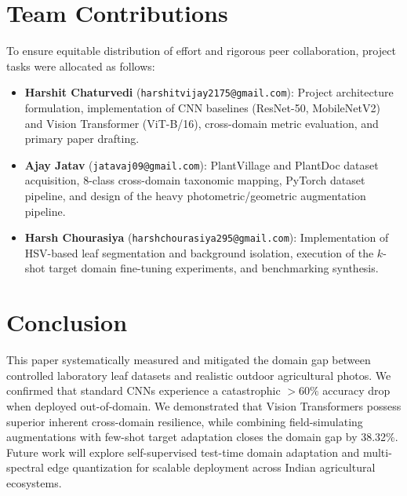 \documentclass[twoside,a4paper,11pt]{article}
\begin{document}
\section{Team Contributions}

To ensure equitable distribution of effort and rigorous peer collaboration, project tasks were allocated as follows:
\begin{itemize}
    \item \textbf{Harshit Chaturvedi} (\texttt{harshitvijay2175@gmail.com}): Project architecture formulation, implementation of CNN baselines (ResNet-50, MobileNetV2) and Vision Transformer (ViT-B/16), cross-domain metric evaluation, and primary paper drafting.
    \item \textbf{Ajay Jatav} (\texttt{jatavaj09@gmail.com}): PlantVillage and PlantDoc dataset acquisition, 8-class cross-domain taxonomic mapping, PyTorch dataset pipeline, and design of the heavy photometric/geometric augmentation pipeline.
    \item \textbf{Harsh Chourasiya} (\texttt{harshchourasiya295@gmail.com}): Implementation of HSV-based leaf segmentation and background isolation, execution of the $k$-shot target domain fine-tuning experiments, and benchmarking synthesis.
\end{itemize}

\section{Conclusion}

This paper systematically measured and mitigated the domain gap between controlled laboratory leaf datasets and realistic outdoor agricultural photos. We confirmed that standard CNNs experience a catastrophic $>60\%$ accuracy drop when deployed out-of-domain. We demonstrated that Vision Transformers possess superior inherent cross-domain resilience, while combining field-simulating augmentations with few-shot target adaptation closes the domain gap by 38.32\%. Future work will explore self-supervised test-time domain adaptation and multi-spectral edge quantization for scalable deployment across Indian agricultural ecosystems.
\end{document}
